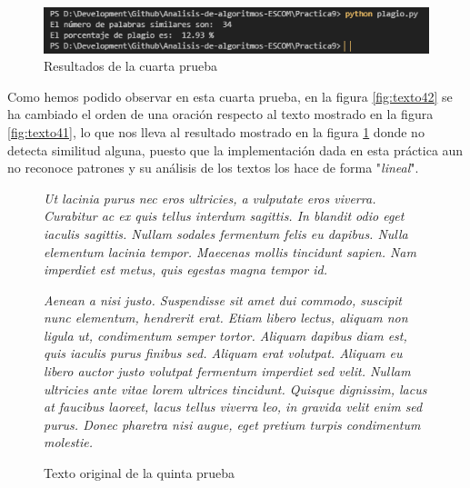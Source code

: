 \documentclass[12pt,twoside]{article}
\begin{document}
\begin{figure}[ht]
    \centering
    \includegraphics[width=1\textwidth]{4.png}
    \caption{Resultados de la cuarta prueba} 
    \label{fig:cuarta}
\end{figure}


Como hemos podido observar en esta cuarta prueba, en la figura  \ref{fig:texto42} se ha cambiado el orden de una oraci\'on respecto al texto mostrado en la figura \ref{fig:texto41}, lo que nos lleva al resultado mostrado en la figura \ref{fig:cuarta} donde no detecta similitud alguna, puesto que la implementaci\'on dada en esta pr\'actica aun no reconoce patrones y su an\'alisis de los textos los hace de forma "\textit{lineal}".

\begin{figure}
    \centering
    \textit{Ut lacinia purus nec eros ultricies, a vulputate eros viverra. 
Curabitur ac ex quis tellus interdum sagittis. In blandit odio 
eget iaculis sagittis. Nullam sodales fermentum felis eu dapibus. 
Nulla elementum lacinia tempor. Maecenas mollis tincidunt sapien. 
Nam imperdiet est metus, quis egestas magna tempor id.}

\textit{Aenean a nisi justo. Suspendisse sit amet dui commodo, 
suscipit nunc elementum, hendrerit erat. Etiam libero lectus, 
aliquam non ligula ut, condimentum semper tortor. Aliquam dapibus 
diam est, quis iaculis purus finibus sed. Aliquam erat volutpat. 
Aliquam eu libero auctor justo volutpat fermentum imperdiet sed 
velit. Nullam ultricies ante vitae lorem ultrices tincidunt. 
Quisque dignissim, lacus at faucibus laoreet, lacus tellus viverra 
leo, in gravida velit enim sed purus. Donec pharetra nisi augue, 
eget pretium turpis condimentum molestie.}
    \caption{Texto original de la quinta prueba}
    \label{fig:texto51}
\end{figure}
\end{document}
